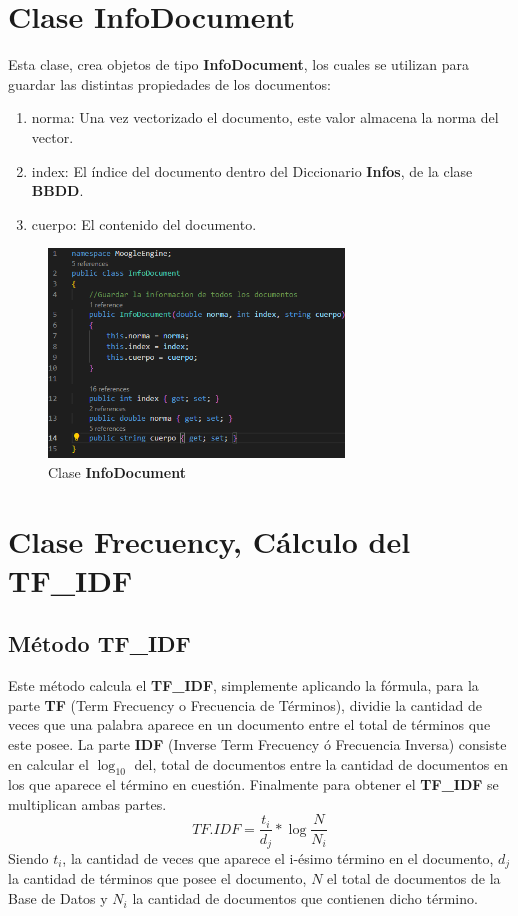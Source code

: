 \documentclass[10pt,a4paper]{article}
\begin{document}
\section{Clase InfoDocument}
\setlength{\parindent}{1em} Esta clase, crea objetos de tipo \textbf{InfoDocument}, los cuales se utilizan para guardar las distintas propiedades de los documentos:
\begin{enumerate}
\item norma: Una vez vectorizado el documento, este valor almacena la norma del vector.
\item index: El \'indice del documento dentro del Diccionario \textbf{Infos}, de la clase \textbf{BBDD}.
\item cuerpo: El contenido del documento.
\end{enumerate}
\begin{figure}[!h] \label{fig:1}
\centering
\includegraphics[width = 0.7\textwidth]{InfoDocument.png}
\caption{Clase \textbf{InfoDocument}}
\end{figure}

\section{Clase Frecuency, C\'alculo del TF\_IDF}
\subsection{M\'etodo TF\_IDF}
\setlength{\parindent}{1em} Este m\'etodo calcula el \textbf{TF\_IDF}, simplemente aplicando la f\'ormula, para la parte \textbf{TF} (Term Frecuency o Frecuencia de T\'erminos), dividie la cantidad de veces que una palabra aparece en un documento entre el total de t\'erminos que este posee. La parte \textbf{IDF} (Inverse Term Frecuency \'o Frecuencia Inversa) consiste en calcular el $\log_{10}$ del, total de documentos entre la cantidad de documentos en los que aparece el t\'ermino en cuesti\'on. Finalmente para obtener el \textbf{TF\_IDF} se multiplican ambas partes.
\begin{equation*}
TF.IDF = \frac{t_i}{d_j} * \log{\frac{N}{N_i}}
\end{equation*}
Siendo $t_i$, la cantidad de veces que aparece el i-\'esimo t\'ermino en el documento, $d_j$ la cantidad de t\'erminos que posee el documento, $N$ el total de documentos de la Base de Datos y $N_i$ la cantidad de documentos que contienen dicho t\'ermino.
\end{document}
